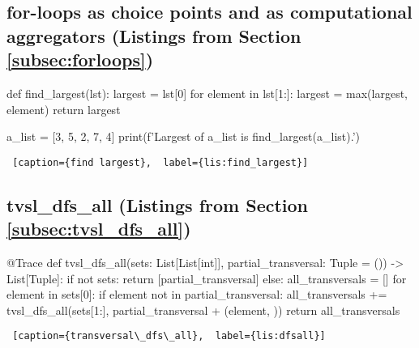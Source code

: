 \subsection{\textbf{for}-loops as choice points and as computational aggregators (Listings from Section \ref{subsec:forloops})} \label{appsubsec:forloops}

\begin{minipage}{\linewidth}  \largev \begin{python}[numbers=left]
def find_largest(lst):
    largest = lst[0]
    for element in lst[1:]:
        largest = max(largest, element)
    return largest

a_list = [3, 5, 2, 7, 4]
print(f'Largest of {a_list} is {find_largest(a_list)}.')
\end{python}
\begin{lstlisting} [caption={find largest},  label={lis:find_largest}]
\end{lstlisting}
\end{minipage}

\subsection{tvsl\_dfs\_all (Listings from Section \ref{subsec:tvsl_dfs_all})} \label{appsubsec:tvsl_dfs_all}

\begin{minipage}{\linewidth} \largev   \hrulefill
\begin{python}[numbers=left]
@Trace
def tvsl_dfs_all(sets: List[List[int]], partial_transversal: Tuple = ()) -> List[Tuple]:
  if not sets:
    return [partial_transversal]
  else:
    all_transversals = []
    for element in sets[0]:
      if element not in partial_transversal:
        all_transversals += tvsl_dfs_all(sets[1:], partial_transversal + (element, ))
    return all_transversals
\end{python}
\begin{lstlisting} [caption={transversal\_dfs\_all},  label={lis:dfsall}]
\end{lstlisting}
\end{minipage}

